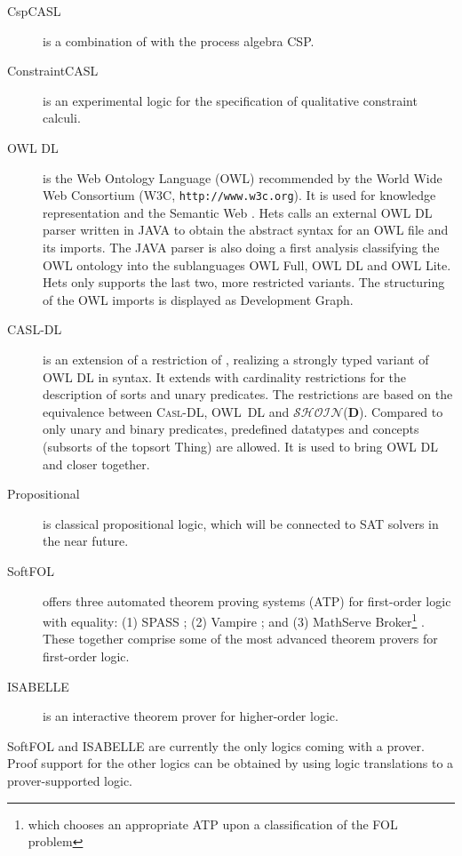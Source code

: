 \documentclass{article}
\newcommand{\normalTEXTSC}[2]{{#1\scriptsize#2}}
\newcommand     {\Isabelle}{\normalTEXTSC{I}{SABELLE}\xspace}
\newcommand{\CASLDL}{\textmd{\textsc{Casl-DL}}\xspace}
\newcommand{\SHOIN}{$\mathcal{SHOIN}$(\textbf{D})\xspace}
\begin{document}
\begin{description}
\item[CspCASL] \cite{Roggenbach:2003:C-CN} is a combination of \CASL
  with the process algebra CSP.

\item[ConstraintCASL] is an experimental logic for the specification
of qualitative constraint calculi.

\item[OWL DL] is the Web Ontology Language (OWL) recommended by the
  World Wide Web Consortium (W3C, \texttt{http://www.w3c.org}). It is
  used for knowledge representation and the Semantic Web
  \cite{berners:2001:SWeb}. 
Hets calls an external OWL DL parser
  written in JAVA to obtain the abstract syntax for an OWL file and its
  imports. The JAVA parser is also doing a first analysis classifying
  the OWL ontology into the sublanguages OWL Full, OWL DL and OWL
  Lite. 
 Hets only supports the last two, more restricted variants. 
The
  structuring of the OWL imports is displayed as Development Graph.

\item[CASL-DL] \cite{OWL-CASL-WADT2004} 
is an extension of a restriction of \CASL, realizing
a strongly typed variant of OWL DL in \CASL syntax.
It extends
  \CASL with cardinality restrictions for the description of sorts and
  unary predicates. The restrictions are based on the equivalence
  between \CASLDL, OWL~DL and \SHOIN. Compared to \CASL only unary
  and binary predicates, predefined datatypes and concepts (subsorts
  of the topsort Thing) are allowed. It is used to bring OWL DL and
  \CASL closer together.

\item[Propositional] is classical propositional logic, which will
be connected to SAT solvers in the near future.

\item[SoftFOL] \cite{LuettichEA06a} offers three automated theorem
  proving systems (ATP) for first-order logic with equality: (1) SPASS
  \cite{WeidenbachEtAl02}; (2) Vampire \cite{RiazanovV02}; and (3)
  MathServe Broker\footnote{which chooses an appropriate ATP upon a
    classification of the FOL problem} \cite{ZimmerAutexier06}.
  These together comprise some of the most advanced theorem provers
  for first-order logic.

\item[\Isabelle] \cite{NipPauWen02} is an interactive theorem prover for higher-order
logic.
\end{description}
SoftFOL and \Isabelle are currently the only logics coming with a
prover. Proof support for the other logics can be obtained by using
logic translations to a prover-supported logic.
\end{document}
